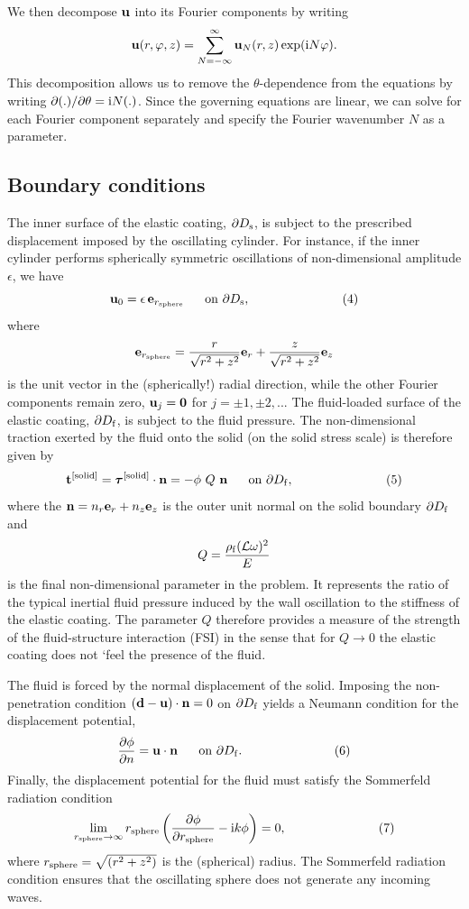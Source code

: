 We then decompose $ {\bf u} $ into its Fourier components by writing \[ {\bf u}(r,\varphi,z) = \sum_{N=-\infty}^{\infty} {\bf u}_N(r,z) \exp({\rm i} N \varphi). \] This decomposition allows us to remove the $ \theta $-\/dependence from the equations by writing $ \partial (.)/\partial\theta={\rm i} N (.) $. Since the governing equations are linear, we can solve for each Fourier component separately and specify the Fourier wavenumber $ N $ as a parameter.\hypertarget{index_bc}{}\subsection{Boundary conditions}\label{index_bc}
The inner surface of the elastic coating, $ \partial D_{\rm s} $, is subject to the prescribed displacement imposed by the oscillating cylinder. For instance, if the inner cylinder performs spherically symmetric oscillations of non-\/dimensional amplitude $ \epsilon$, we have \[ \mbox{\bf u}_0 = \epsilon \, \mbox{\bf e}_{r_{\rm sphere}} \mbox{\ \ \ \ \ on $\partial D_{\rm s}$}, \ \ \ \ \ \ \ \ \ \ \ \ \ \ \ \ \ \ \ \ \ \ (4) \] where \[ \mbox{\bf e}_{r_{\rm sphere}} = \frac{r}{\sqrt{r^2+z^2}} {\bf e}_r + \frac{z}{\sqrt{r^2+z^2}} {\bf e}_z \] is the unit vector in the (spherically!) radial direction, while the other Fourier components remain zero, $ \mbox{\bf u}_j = {\bf 0} $ for $ j=\pm 1, \pm 2, ...$ The fluid-\/loaded surface of the elastic coating, $ \partial D_{\rm f} $, is subject to the fluid pressure. The non-\/dimensional traction exerted by the fluid onto the solid (on the solid stress scale) is therefore given by \[ {\bf t}^{\rm [solid]} = \mbox{\boldmath$ \tau $}^{\rm [solid]} \cdot {\bf n} = - \phi \ Q \ {\bf n} \mbox{\ \ \ \ \ on $\partial D_{\rm f}$}, \ \ \ \ \ \ \ \ \ \ \ \ \ \ \ \ \ \ \ \ \ \ (5) \] where the $ {\bf n} = n_r {\bf e}_r + n_z {\bf e}_z $ is the outer unit normal on the solid boundary $\partial D_{\rm f}$ and \[ Q=\frac{\rho_{\rm f}({\cal L}\omega)^2}{E} \] is the final non-\/dimensional parameter in the problem. It represents the ratio of the typical inertial fluid pressure induced by the wall oscillation to the stiffness of the elastic coating. The parameter $Q$ therefore provides a measure of the strength of the fluid-\/structure interaction (F\+SI) in the sense that for $Q \to 0$ the elastic coating does not `feel\textquotesingle{} the presence of the fluid.

The fluid is forced by the normal displacement of the solid. Imposing the non-\/penetration condition $({\bf d} - {\bf u}) \cdot {\bf n} = 0$ on $\partial D_{\rm f}$ yields a Neumann condition for the displacement potential, \[ \frac{\partial \phi}{\partial n} = {\bf u} \cdot {\bf n} \mbox{\ \ \ \ \ on $\partial D_{\rm f}$}. \ \ \ \ \ \ \ \ \ \ \ \ \ \ \ \ \ \ \ \ \ \ (6) \] Finally, the displacement potential for the fluid must satisfy the Sommerfeld radiation condition \[ \lim_{r_{\rm sphere} \to \infty} r_{\rm sphere} \left( \frac{\partial \phi}{\partial r_{\rm sphere} } - {\rm i} k \phi \right) = 0, \ \ \ \ \ \ \ \ \ \ \ \ \ \ \ \ \ \ \ \ \ \ (7) \] where $ r_{\rm sphere} = \sqrt{(r^2+z^2)} $ is the (spherical) radius. The Sommerfeld radiation condition ensures that the oscillating sphere does not generate any incoming waves.

